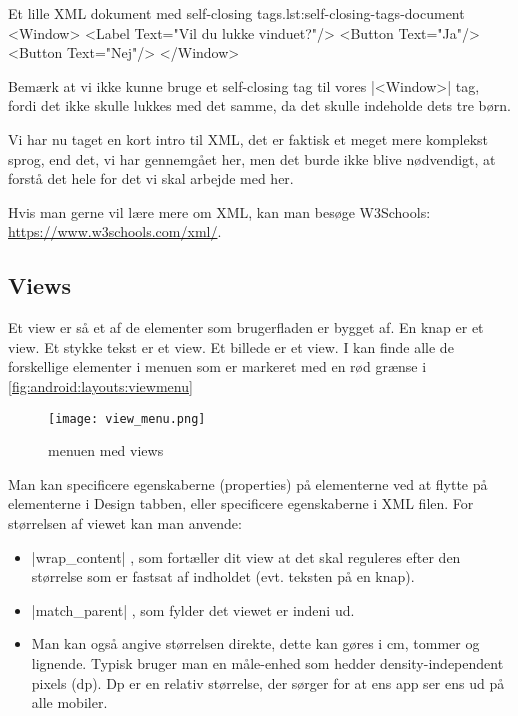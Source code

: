 \begin{example}
	\begin{XmlCode}{Et lille XML dokument med self-closing tags.}{lst:self-closing-tags-document}
		<Window>
			<Label Text="Vil du lukke vinduet?"/>
			<Button Text="Ja"/>
			<Button Text="Nej"/>
		</Window>
	\end{XmlCode}
\end{example}

\begin{remark}
	Bemærk at vi ikke kunne bruge et self-closing tag til vores \XmlInline|<Window>| tag, fordi det ikke skulle lukkes med det samme, da det skulle indeholde dets tre børn.
\end{remark}

Vi har nu taget en kort intro til XML, det er faktisk et meget mere komplekst sprog, end det, vi har gennemgået her, men det burde ikke blive nødvendigt, at forstå det hele for det vi skal arbejde med her.

Hvis man gerne vil lære mere om XML, kan man besøge W3Schools: \url{https://www.w3schools.com/xml/}.

\subsection{Views}
Et view er så et af de elementer som brugerfladen er bygget af. En knap er et view. Et stykke tekst er et view. Et billede er et view. I kan finde alle de forskellige elementer i menuen som er markeret med en rød grænse i \autoref{fig:android:layouts:viewmenu}

\begin{figure}[h]
	\begin{center}
		\texttt{[image: view\_menu.png]}
		\caption{menuen med views}
		\label{fig:android:layouts:viewmenu}
	\end{center}
\end{figure}

Man kan specificere egenskaberne (properties) på elementerne ved at flytte på elementerne i Design tabben, eller specificere egenskaberne i XML filen. For størrelsen af viewet kan man anvende:
\begin{itemize}
	\item \XmlInline|wrap_content| , som fortæller dit view at det skal reguleres efter den størrelse som er fastsat af indholdet (evt. teksten på en knap).
	\item \XmlInline|match_parent| , som fylder det viewet er indeni ud.\\
	\item Man kan også angive størrelsen direkte, dette kan gøres i cm, tommer og lignende. Typisk bruger man en måle-enhed som hedder density-independent pixels (dp). Dp er en relativ størrelse, der sørger for at ens app ser ens ud på alle mobiler.
\end{itemize}

